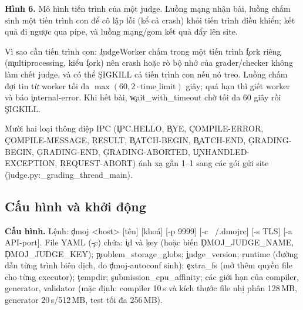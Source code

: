 \begin{center}
\begin{minipage}{\textwidth}
\par\vspace{3pt}\small\raggedright\textbf{Hình 6.} Mô hình tiến trình của một judge. Luồng mạng nhận bài, luồng chấm sinh một tiến trình con để cô lập lỗi (kể cả crash) khỏi tiến trình điều khiển; kết quả đi ngược qua pipe, và luồng mạng/gom kết quả đẩy lên site. \end{minipage}\end{center}

Vì sao cần tiến trình con: \c{JudgeWorker} chấm trong một tiến trình \c{fork} riêng (\c{multiprocessing}, kiểu \c{fork}) nên crash hoặc rò bộ nhớ của grader/checker không làm chết judge, và có thể \c{SIGKILL} cả tiến trình con nếu nó treo. Luồng chấm đợi tin từ worker tối đa $\max(60, 2\cdot\text{time\_limit})$ giây; quá hạn thì giết worker và báo \c{internal-error}. Khi hết bài, \c{wait_with_timeout} chờ tối đa 60 giây rồi \c{SIGKILL}. \tS

Mười hai loại thông điệp IPC (\c{IPC.HELLO}, \c{BYE}, \c{COMPILE-ERROR}, \c{COMPILE-MESSAGE}, \c{RESULT}, \c{BATCH-BEGIN}, \c{BATCH-END}, \c{GRADING-BEGIN}, \c{GRADING-END}, \c{GRADING-ABORTED}, \c{UNHANDLED-EXCEPTION}, \c{REQUEST-ABORT}) ánh xạ gần 1--1 sang các gói gửi site (\f{judge.py:_grading_thread_main}). \tS

\subsection{Cấu hình và khởi động}
\textbf{Cấu hình.} Lệnh: \c{dmoj <host> [tên] [khoá] [-p 9999] [-c ~/.dmojrc] [-s TLS] [-a API-port]}. File YAML (\c{-c}) chứa: \c{id} và \c{key} (hoặc biến \c{DMOJ_JUDGE_NAME}, \c{DMOJ_JUDGE_KEY}); \c{problem_storage_globs}; \c{judge_version}; \c{runtime} (đường dẫn từng trình biên dịch, do \c{dmoj-autoconf} sinh); \c{extra_fs} (mở thêm quyền file cho từng executor); \c{tempdir}; \c{submission_cpu_affinity}; các giới hạn của compiler, generator, validator (mặc định: compiler 10\,s và kích thước file nhị phân 128\,MB, generator 20\,s/512\,MB, test tối đa 256\,MB). \tS

